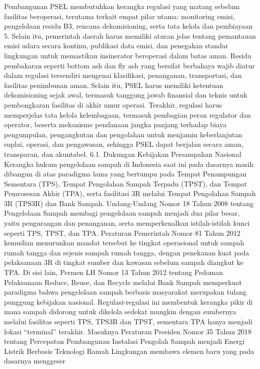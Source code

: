\documentclass[
  letterpaper,
  DIV=11,
  numbers=noendperiod]{scrreprt}
\begin{document}
Pembangunan PSEL membutuhkan kerangka regulasi yang matang sebelum
fasilitas beroperasi, terutama terkait empat pilar utama: monitoring
emisi, pengelolaan residu B3, rencana dekomisioning, serta tata kelola
dan pembiayaan 5. Selain itu, pemerintah daerah harus memiliki aturan
jelas tentang pemantauan emisi udara secara kontinu, publikasi data
emisi, dan penegakan standar lingkungan untuk memastikan insinerator
beroperasi dalam batas aman. Residu pembakaran seperti bottom ash dan
fly ash yang bersifat berbahaya wajib diatur dalam regulasi tersendiri
mengenai klasifikasi, penanganan, transportasi, dan fasilitas penimbunan
aman. Selain itu, PSEL harus memiliki ketentuan dekomisioning sejak
awal, termasuk tanggung jawab finansial dan teknis untuk pembongkaran
fasilitas di akhir umur operasi. Terakhir, regulasi harus memperjelas
tata kelola kelembagaan, termasuk pembagian peran regulator dan
operator, beserta mekanisme pendanaan jangka panjang terhadap biaya
pengumpulan, pengangkutan dan pengolahan untuk menjamin keberlanjutan
suplai, operasi, dan pengawasan, sehingga PSEL dapat berjalan secara
aman, transparan, dan akuntabel. 6.1. Dukungan Kebijakan Persampahan
Nasional Kerangka hukum pengelolaan sampah di Indonesia saat ini pada
dasarnya masih dibangun di atas paradigma lama yang bertumpu pada Tempat
Penampungan Sementara (TPS), Tempat Pengolahan Sampah Terpadu (TPST),
dan Tempat Pemrosesan Akhir (TPA), serta fasilitasi 3R melalui Tempat
Pengolahan Sampah 3R (TPS3R) dan Bank Sampah. Undang-Undang Nomor 18
Tahun 2008 tentang Pengelolaan Sampah membagi pengelolaan sampah menjadi
dua pilar besar, yaitu pengurangan dan penanganan, serta memperkenalkan
istilah-istilah kunci seperti TPS, TPST, dan TPA. Peraturan Pemerintah
Nomor 81 Tahun 2012 kemudian menurunkan mandat tersebut ke tingkat
operasional untuk sampah rumah tangga dan sejenis sampah rumah tangga,
dengan penekanan kuat pada pelaksanaan 3R di tingkat sumber dan kawasan
sebelum sampah diangkut ke TPA. Di sisi lain, Permen LH Nomor 13 Tahun
2012 tentang Pedoman Pelaksanaan Reduce, Reuse, dan Recycle melalui Bank
Sampah memperkuat paradigma bahwa pengelolaan sampah berbasis masyarakat
merupakan tulang punggung kebijakan nasional. Regulasi-regulasi ini
membentuk kerangka pikir di mana sampah didorong untuk dikelola sedekat
mungkin dengan sumbernya melalui fasilitas seperti TPS, TPS3R dan TPST,
sementara TPA hanya menjadi lokasi ``terminal'' terakhir. Masuknya
Peraturan Presiden Nomor 35 Tahun 2018 tentang Percepatan Pembangunan
Instalasi Pengolah Sampah menjadi Energi Listrik Berbasis Teknologi
Ramah Lingkungan membawa elemen baru yang pada dasarnya menggeser
\end{document}
